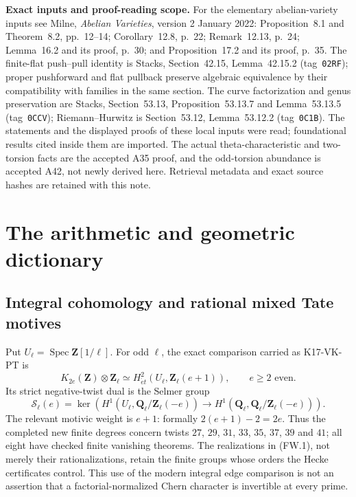\documentclass[11pt,a4paper]{article}
\theoremstyle{definition}
\renewcommand{\paragraph}[1]{\par\smallskip\noindent\textbf{#1}\quad\ignorespaces}
\begin{document}
\paragraph{Exact inputs and proof-reading scope.}
For the elementary abelian-variety inputs see Milne,
\emph{Abelian Varieties}, version 2 January 2022:
Proposition~8.1 and Theorem~8.2, pp.~12--14;
Corollary~12.8, p.~22; Remark~12.13, p.~24;
Lemma~16.2 and its proof, p.~30; and Proposition~17.2 and
its proof, p.~35.  The finite-flat push--pull identity is
Stacks, Section~42.15, Lemma~42.15.2 (tag~\texttt{02RF});
proper pushforward and flat pullback preserve algebraic
equivalence by their compatibility with families in the same
section.  The curve factorization and genus preservation are
Stacks, Section~53.13, Proposition~53.13.7 and
Lemma~53.13.5 (tag~\texttt{0CCV}); Riemann--Hurwitz is
Section~53.12, Lemma~53.12.2 (tag~\texttt{0C1B}).
The statements and the displayed proofs of these local inputs
were read; foundational results cited inside them are imported.
The actual theta-characteristic and two-torsion facts are the
accepted A35 proof, and the odd-torsion abundance is accepted
A42, not newly derived here.  Retrieval metadata and exact
source hashes are retained with this note.



\section{The arithmetic and geometric dictionary}
\label{sec:framework}

\subsection{Integral cohomology and rational mixed Tate motives}

Put $U_\ell=\operatorname{Spec}\mathbf Z[1/\ell]$.
For odd $\ell$, the exact comparison carried as K17-VK-PT is
\[
 K_{2e}(\mathbf Z)\otimes\mathbf Z_\ell
       \simeq H^2_{\acute et}(U_\ell,\mathbf Z_\ell(e+1)),
 \qquad e\ge2\text{ even}.
 \tag{FW.1}
\]
Its strict negative-twist dual is the Selmer group
\[
 \mathcal S_\ell(e)=\ker\left(
 H^1(U_\ell,\mathbf Q_\ell/\mathbf Z_\ell(-e))
 \longrightarrow
 H^1(\mathbf Q_\ell,\mathbf Q_\ell/\mathbf Z_\ell(-e))\right).
 \tag{FW.2}
\]
The relevant motivic weight is $e+1$: formally $2(e+1)-2=2e$.
Thus the completed new finite degrees concern twists $27$, $29$, $31$,
$33$, $35$, $37$, $39$ and $41$; all eight have checked finite vanishing theorems.
The realizations in (FW.1), not merely their rationalizations,
retain the finite groups whose orders the Hecke certificates
control. This use of the modern integral edge comparison is
not an assertion that a factorial-normalized Chern character
is invertible at every prime.
\end{document}
